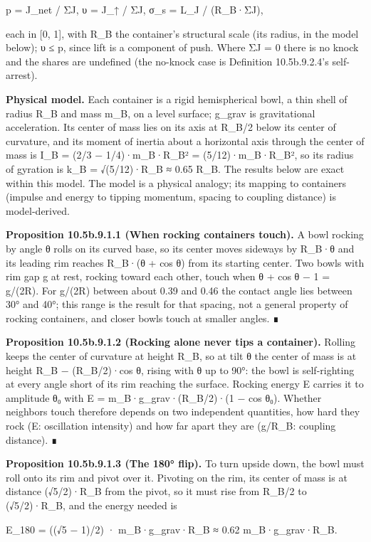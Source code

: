 \documentclass[
]{article}
\begin{document}
p = J\_net / ΣJ, υ = J\_↑ / ΣJ, σ\_s = L\_J / (R\_B·ΣJ),

each in {[}0, 1{]}, with R\_B the container's structural scale (its
radius, in the model below); υ ≤ p, since lift is a component of push.
Where ΣJ = 0 there is no knock and the shares are undefined (the
no-knock case is Definition 10.5b.9.2.4's self-arrest).

\textbf{Physical model.} Each container is a rigid hemispherical bowl, a
thin shell of radius R\_B and mass m\_B, on a level surface; g\_grav is
gravitational acceleration. Its center of mass lies on its axis at
R\_B/2 below its center of curvature, and its moment of inertia about a
horizontal axis through the center of mass is I\_B = (2/3 −
1/4)·m\_B·R\_B² = (5/12)·m\_B·R\_B², so its radius of gyration is k\_B =
√(5/12)·R\_B ≈ 0.65 R\_B. The results below are exact within this model.
The model is a physical analogy; its mapping to containers (impulse and
energy to tipping momentum, spacing to coupling distance) is
model-derived.

\textbf{Proposition 10.5b.9.1.1 (When rocking containers touch).} A bowl
rocking by angle θ rolls on its curved base, so its center moves
sideways by R\_B·θ and its leading rim reaches R\_B·(θ + cos θ) from its
starting center. Two bowls with rim gap g at rest, rocking toward each
other, touch when θ + cos θ − 1 = g/(2R). For g/(2R) between about 0.39
and 0.46 the contact angle lies between 30° and 40°; this range is the
result for that spacing, not a general property of rocking containers,
and closer bowls touch at smaller angles. ∎

\textbf{Proposition 10.5b.9.1.2 (Rocking alone never tips a container).}
Rolling keeps the center of curvature at height R\_B, so at tilt θ the
center of mass is at height R\_B − (R\_B/2)·cos θ, rising with θ up to
90°: the bowl is self-righting at every angle short of its rim reaching
the surface. Rocking energy E carries it to amplitude θ₀ with E =
m\_B·g\_grav·(R\_B/2)·(1 − cos θ₀). Whether neighbors touch therefore
depends on two independent quantities, how hard they rock (E:
oscillation intensity) and how far apart they are (g/R\_B: coupling
distance). ∎

\textbf{Proposition 10.5b.9.1.3 (The 180° flip).} To turn upside down,
the bowl must roll onto its rim and pivot over it. Pivoting on the rim,
its center of mass is at distance (√5/2)·R\_B from the pivot, so it must
rise from R\_B/2 to (√5/2)·R\_B, and the energy needed is

E\_180 = ((√5 − 1)/2) · m\_B·g\_grav·R\_B ≈ 0.62 m\_B·g\_grav·R\_B.
\end{document}
